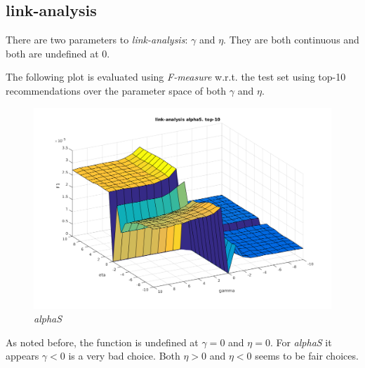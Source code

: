 
\subsection{link-analysis}

There are two parameters to \textit{link-analysis}: $\gamma$ and $\eta$. They are both continuous and both are undefined at 0.

The following plot is evaluated using \textit{F-measure} w.r.t. the test set using top-10 recommendations over the parameter space of both $\gamma$ and $\eta$.

\begin{figure}[h!]
    \includegraphics[width=\textwidth]{fig/link_eta_gamma/alphaS_link_eta.png}
    \caption{\textit{alphaS}}
    \label{fig:linkalphaS}
\end{figure}

As noted before, the function is undefined at $\gamma = 0$ and $\eta = 0$. For \textit{alphaS} it appears $\gamma < 0$ is a very bad choice. Both $\eta > 0$ and $\eta < 0$ seems to be fair choices.

